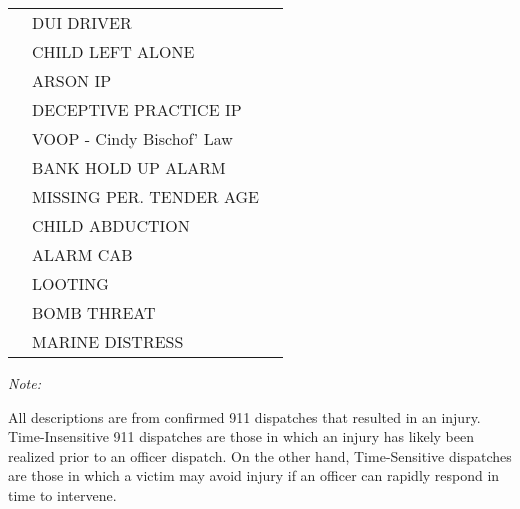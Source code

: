 \begin{table}[H]
\begin{threeparttable}
\begin{tabular}[t]{lll}
 & DUI DRIVER & \\
 & CHILD LEFT ALONE & \\
 & ARSON IP & \\
 & DECEPTIVE PRACTICE IP & \\
\addlinespace
 & VOOP - Cindy Bischof' Law & \\
 & BANK HOLD UP ALARM & \\
 & MISSING PER. TENDER AGE & \\
 & CHILD ABDUCTION & \\
 & ALARM CAB & \\
\addlinespace
 & LOOTING & \\
 & BOMB THREAT & \\
 & MARINE DISTRESS & \\
\bottomrule
\end{tabular}
\begin{tablenotes}
\item \textit{Note: } 
\item All descriptions are from confirmed 911 dispatches that resulted                       in an injury. Time-Insensitive 911 dispatches are those in which                       an injury has likely been realized prior to an officer dispatch.                       On the other hand, Time-Sensitive dispatches are those in which                       a victim may avoid injury if an officer can rapidly respond in time                       to intervene.                   
\end{tablenotes}
\end{threeparttable}
\end{table}

